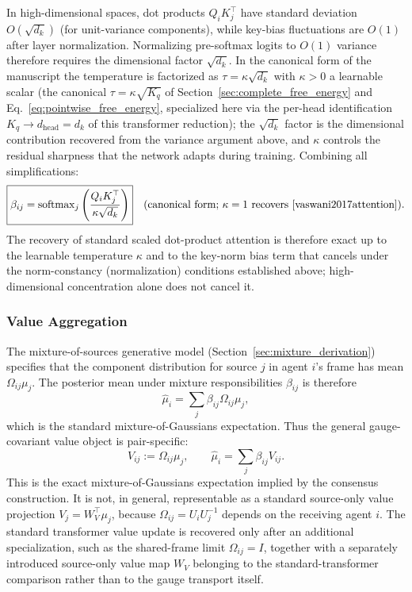\documentclass[11pt]{article}
\begin{document}
In high-dimensional spaces, dot products $Q_iK_j^\top$ have standard deviation $O(\sqrt{d_k})$ (for unit-variance components), while key-bias fluctuations are $O(1)$ after layer normalization. Normalizing pre-softmax logits to $O(1)$ variance therefore requires the dimensional factor $\sqrt{d_k}$. In the canonical form of the manuscript the temperature is factorized as $\tau = \kappa\sqrt{d_k}$ with $\kappa > 0$ a learnable scalar (the canonical $\tau = \kappa\sqrt{K_q}$ of Section~\ref{sec:complete_free_energy} and Eq.~\eqref{eq:pointwise_free_energy}, specialized here via the per-head identification $K_q \to d_{\mathrm{head}} = d_k$ of this transformer reduction); the $\sqrt{d_k}$ factor is the dimensional contribution recovered from the variance argument above, and $\kappa$ controls the residual sharpness that the network adapts during training. Combining all simplifications:
\begin{equation}
\boxed{\beta_{ij} = \mathrm{softmax}_j\left(\frac{Q_i K_j^\top}{\kappa\sqrt{d_k}}\right)}\quad\text{(canonical form; }\kappa=1\text{ recovers~\cite{vaswani2017attention}).}
\end{equation}
The recovery of standard scaled dot-product attention is therefore exact up to the learnable temperature $\kappa$ and to the key-norm bias term that cancels under the norm-constancy (normalization) conditions established above; high-dimensional concentration alone does not cancel it.

\subsubsection{Value Aggregation}\label{sec:value_aggregation_itfb}

The mixture-of-sources generative model (Section~\ref{sec:mixture_derivation}) specifies that the component distribution for source $j$ in agent $i$'s frame has mean $\Omega_{ij}\mu_j$. The posterior mean under mixture responsibilities $\beta_{ij}$ is therefore
\begin{equation}
\hat\mu_i = \sum_j \beta_{ij} \Omega_{ij}\mu_j,
\label{eq:glk_mixture_aggregation_itfb}
\end{equation}
which is the standard mixture-of-Gaussians expectation. Thus the general gauge-covariant value object is pair-specific:
\begin{equation}
V_{ij} := \Omega_{ij}\mu_j,
\qquad
\hat\mu_i = \sum_j \beta_{ij}V_{ij}.
\end{equation}
This is the exact mixture-of-Gaussians expectation implied by the consensus construction. It is not, in general, representable as a standard source-only value projection $V_j=W_V^\top\mu_j$, because $\Omega_{ij}=U_iU_j^{-1}$ depends on the receiving agent $i$. The standard transformer value update is recovered only after an additional specialization, such as the shared-frame limit $\Omega_{ij}=I$, together with a separately introduced source-only value map $W_V$ belonging to the standard-transformer comparison rather than to the gauge transport itself.
\end{document}
